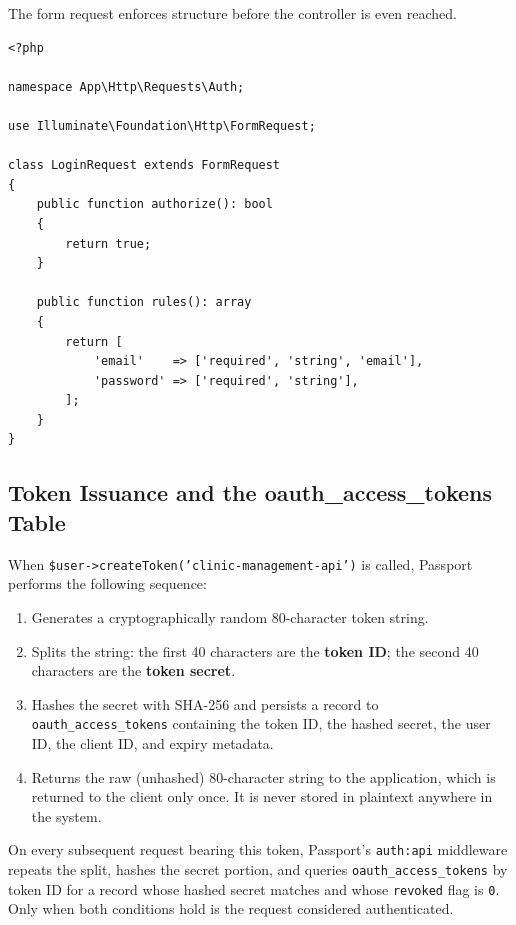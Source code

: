 The  form request enforces structure before the
controller is even reached.

\begin{lstlisting}[style=php, caption={\texttt{app/Http/Requests/Auth/LoginRequest.php}.}]
<?php

namespace App\Http\Requests\Auth;

use Illuminate\Foundation\Http\FormRequest;

class LoginRequest extends FormRequest
{
    public function authorize(): bool
    {
        return true;
    }

    public function rules(): array
    {
        return [
            'email'    => ['required', 'string', 'email'],
            'password' => ['required', 'string'],
        ];
    }
}
\end{lstlisting}

\subsection{Token Issuance and the oauth\_access\_tokens Table}

When \texttt{\$user->createToken('clinic-management-api')} is called,
Passport performs the following sequence:

\begin{enumerate}
  \item Generates a cryptographically random 80-character token string.
  \item Splits the string: the first 40 characters are the
    \textbf{token ID}; the second 40 characters are the
    \textbf{token secret}.
  \item Hashes the secret with SHA-256 and persists a record to
    \texttt{oauth\_access\_tokens} containing the token ID, the hashed
    secret, the user ID, the client ID, and expiry metadata.
  \item Returns the raw (unhashed) 80-character string to the
    application, which is returned to the client only once. It is never
    stored in plaintext anywhere in the system.
\end{enumerate}

On every subsequent request bearing this token, Passport's
\texttt{auth:api} middleware repeats the split, hashes the secret
portion, and queries \texttt{oauth\_access\_tokens} by token ID for a
record whose hashed secret matches and whose \texttt{revoked} flag is
\texttt{0}. Only when both conditions hold is the request considered
authenticated.

